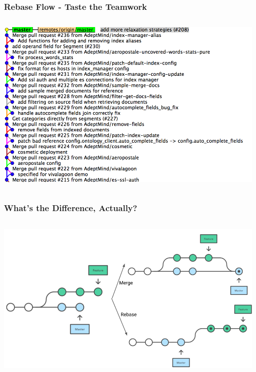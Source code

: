 \documentclass{beamer}
\begin{document}
\begin{frame}
\frametitle{Rebase Flow - Taste the Teamwork}
\begin{center}
  \begin{columns}
    \column{\dimexpr\paperwidth+20pt}
    \includegraphics[width=\paperwidth]{pictures/nice.png}
    \end{columns}
\end{center}
\end{frame}

\begin{frame}
\frametitle{What's the Difference, Actually?}
\begin{center}
  \begin{columns}
    \column{\dimexpr\paperwidth+20pt}
    \includegraphics[width=\paperwidth]{pictures/merge_or_rebase.png}
    \end{columns}
\end{center}
\end{frame}
\end{document}
